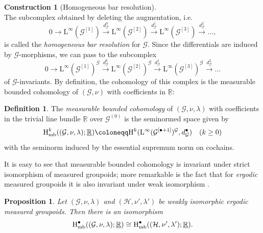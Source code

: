\documentclass[11pt, oneside]{amsart}
\newtheorem{prop}[lemma]{Proposition}
\theoremstyle{definition}
\newtheorem{defn}[lemma]{Definition}
\newtheorem{con}[lemma]{Construction}
\theoremstyle{remark}
\theoremstyle{TheoremNum}
\newcommand{\Hmb}{\textup{H}_{\textup{mb}}}
\newcommand{\Linf}{\mathrm{L}^{\infty}}
\newcommand{\cG}{\mathcal{G}}
\newcommand{\bR}{\mathbb{R}}
\begin{document}
\begin{con}[Homogeneous bar resolution]
\[\]
The subcomplex obtained by deleting the augmentation, i.e.
\begin{equation}\label{BarResolution}
0 \to \Linf(\cG^{[1]})  \xrightarrow{d_{\cG}^0} \Linf(\cG^{[2]})  \xrightarrow{d_{\cG}^1} \Linf(\cG^{[3]})  \xrightarrow{d_{\cG}^2}  \dots,
\end{equation}
is called the \emph{homogeneous bar resolution} for $\cG$. Since the differentials are induced by $\cG$-morphisms, we can pass to the subcomplex 
\[
0 \to \Linf(\cG^{[1]})^{\cG}  \xrightarrow{d_{\cG}^0} \Linf(\cG^{[2]})^{\cG}  \xrightarrow{d_{\cG}^1} \Linf(\cG^{[3]})^{\cG}  \xrightarrow{d_{\cG}^2}  \dots
\]
of $\cG$-invariants. By definition, the cohomology of this complex is the measurable bounded cohomology of $(\cG, \nu)$ with coefficients in $\underline{\bR}$:
\end{con}
\begin{defn} The \emph{measurable bounded cohomology} of $(\cG,\nu, \lambda)$ with coefficients in the trivial line bundle $\underline{\bR}$ over $\cG^{(0)}$ is the seminormed space given by
\[
\Hmb^k((\cG,\nu, \lambda); \underline{\bR}) \coloneqq  \mathrm{H}^k(\Linf(\cG^{[\bullet + 1]})^{\cG}, d_{\cG}^{\bullet}) \quad (k \geq 0)
\]
with the seminorm induced by the essential supremum norm on cochains.
\end{defn}
It is easy to see that measurable bounded cohomology is invariant under strict isomorphism of measured groupoids; more remarkable is the fact that for \emph{ergodic} measured groupoids it is also invariant under weak isomorphism \cite{sarti:savini:23}. 
\begin{prop}\label{proposition:weak:iso:BC}
Let $(\cG,\nu,\lambda)$ and $(\mathcal{H},\nu',\lambda')$ be weakly isomorphic ergodic measured groupoids. Then there is an isomorphism
\[\Hmb^\bullet((\cG,\nu,\lambda);\underline{\mathbb{R}})\cong\Hmb^\bullet((\mathcal{H},\nu',\lambda');\underline{\mathbb{R}}).\]
\end{prop}
\end{document}
